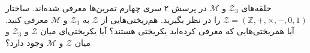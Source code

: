 حلقه‌های 
$\mathcal{Z}_{3}$
و
$\mathcal{M}$
در پرسش ۲ سری چهارم تمرین‌ها معرفی شده‌اند. ساختار
$\mathcal{Z} = (\mathbb{Z},+,\times,-,0,1)$
را در نظر بگیرید. هم‌ریختی‌هایی از 
$\mathcal{Z}$
به 
$\mathcal{Z}_{3}$
و
$\mathcal{M}$
معرفی کنید. آیا همریختی‌هایی که معرفی کرده‌اید یکریختی هستند؟ آیا یکریختی‌ای میان 
$\mathcal{Z}$
و
$\mathcal{Z}_{3}$
و میان
$\mathcal{Z}$
و
$\mathcal{M}$
وجود دارد؟